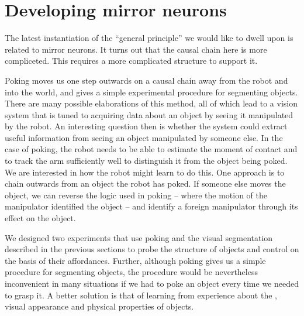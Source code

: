 
\section{Developing mirror neurons}

\ifverbose
The latest instantiation of the ``general principle'' we would like to
dwell upon is related to mirror neurons. It turns out that the causal
chain here is more compliceted. This requires a more complicated
structure to support it.
\fi

Poking moves us one step outwards on a causal chain away from the
robot and into the world, and gives a simple experimental procedure
for segmenting objects.  There are many possible elaborations of this
method, all of which lead to a
vision system that is tuned to acquiring data about an object by
seeing it manipulated by the robot.  An interesting question then is
whether the system could extract useful information from seeing an
object manipulated by someone else.  In the case of poking, the robot
needs to be able to estimate the moment of contact and to track the arm
sufficiently well to distinguish it from the object being poked.  We
are interested in how the robot might learn to do this.  One approach
is to chain outwards from an object the robot has poked.  If someone
else moves the object, we can reverse the logic used in poking --
where the motion of the manipulator identified the object -- and
identify a foreign manipulator through its effect on the object.

We designed two experiments that use poking and the visual
segmentation described in the previous sections to probe 
the structure of objects and control \ahhbehavior{} on the basis of
their affordances. Further, although poking gives us a simple 
procedure for segmenting objects, the procedure would be 
nevertheless inconvenient in many situations if we had to poke an 
object every time we needed to grasp it. A better solution is that 
of learning from experience about the \ahhbehavior{}, visual appearance and 
physical properties of objects.

